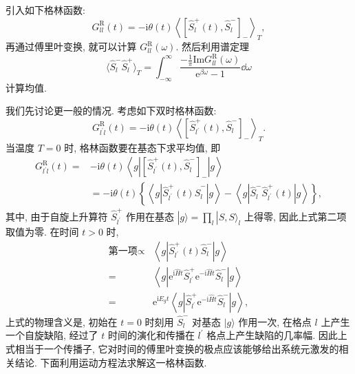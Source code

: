 引入如下格林函数:
\begin{equation}
G_{ll}^\mathrm{R}(t)=-\mathrm{i} \theta(t)\left\langle\left[\hat{S}_{l}^{+}(t), \hat{S}_{l}^{-}\right]_{-}\right\rangle_{T} ,
\end{equation}
再通过傅里叶变换, 就可以计算 $G_{ll}^\mathrm{R}(\omega)$. 然后利用谱定理
\begin{equation}
    \langle \hat{S}_l^-\hat{S}_l ^+\rangle_T=\int_{-\infty}^\infty\frac{-\frac{1}{\pi}\mathrm{Im}G_{ll}^{\mathrm{R}}(\omega)}{\mathrm{e}^{\beta\omega}-1}\dd\omega
\end{equation}
计算均值. 

我们先讨论更一般的情况. 考虑如下双时格林函数:
\begin{equation}
G_{l^{\prime} l}^\mathrm{R}(t)=-\mathrm{i} \theta(t)\left\langle\left[\hat{S}_{l^{\prime}}^{+}(t), \hat{S}_{l}^{-}\right]_{-}\right\rangle_{T} .
\end{equation}
当温度 $T=0$ 时, 格林函数要在基态下求平均值, 即
 \begin{align}
        G_{l^{\prime}l}^{\mathrm{R}}(t)=&-\mathrm{i}\theta(t)\left\langle g\left| \left[ \hat{S}_{l^\prime}^+(t),\hat{S}_l^- \right]_- \right|g \right\rangle\nonumber\\
        &=-\mathrm{i}\theta(t)\left\{ \left\langle g\left|\hat{S}^+_{l^\prime}(t)\hat{S}_{l}^- \right| g \right\rangle -\left\langle g \left| \hat{S}_l^-\hat{S}_{l^\prime}^+(t) \right| g \right\rangle \right\},
    \end{align}
其中, 由于自旋上升算符 $\hat{S}^+_{l^\prime}$ 作用在基态 $\displaystyle |g\rangle = \prod_l |S,S\rangle_l$ 上得零, 因此上式第二项取值为零. 在时间 $t>0$ 时, 
 \begin{align}
        \text{第一项}\propto &\left\langle g\left| \hat{S}_{l^\prime}^+(t)\hat{S}_l^- \right| g \right\rangle\nonumber\\
        =&\left\langle g\left| \mathrm{e}^{\mathrm{i}\hat{H}t}\hat{S}_{l^\prime}^+\mathrm{e}^{-\mathrm{i}\hat{H}t}\hat{S}_l^- \right| g \right\rangle\nonumber\\
        =&\mathrm{e}^{\mathrm{i} E_gt}\left\langle g\left| \hat{S}_{l^\prime}^+\mathrm{e}^{-\mathrm{i}\hat{H}t}\hat{S}_l^- \right| g \right\rangle,
    \end{align}
上式的物理含义是, 初始在 $t=0$ 时刻用 $\hat{S}_l^-$ 对基态 $|g\rangle$ 作用一次, 在格点 $l$ 上产生一个自旋缺陷, 经过了 $t$ 时间的演化和传播在 $l^\prime$ 格点上产生缺陷的几率幅. 因此上式相当于一个传播子, 它对时间的傅里叶变换的极点应该能够给出系统元激发的相关结论.
下面利用运动方程法求解这一格林函数. 

